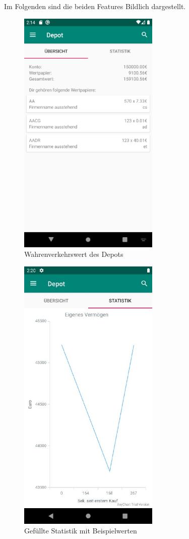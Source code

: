 \documentclass[10pt]{scrartcl}
\begin{document}
Im Folgenden sind die beiden Features Bildlich dargestellt.

\begin{figure}[H]
	\centering
	\includegraphics[width=0.6\textwidth]{Bilder/Prsi/depot.png}
	\caption{Wahrenverkehrswert des Depots}
\end{figure}

\begin{figure}[H]
	\centering
	\includegraphics[width=0.6\textwidth]{Bilder/Prsi/verlauf.png}
	\caption{Gefüllte Statistik mit Beispielwerten}
\end{figure}
\end{document}
